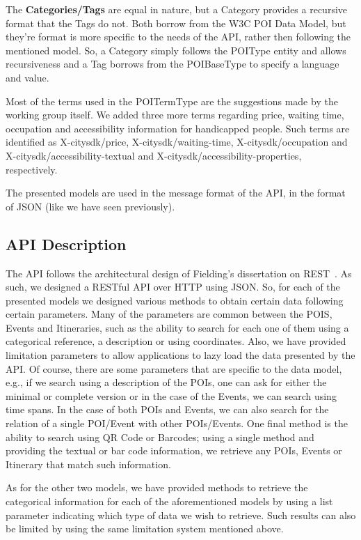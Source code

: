 \documentclass[times]{ettauth}
\begin{document}
The \textbf{Categories/Tags} are equal in nature, but a Category provides a recursive format that the Tags do not. Both borrow from the W3C POI Data Model, but they're format is more specific to the needs of the API, rather then following the mentioned model. So, a Category simply follows the POIType entity and allows recursiveness and a Tag borrows from the POIBaseType to specify a language and value.

Most of the terms used in the POITermType are the suggestions made by the working group itself. We added three more terms regarding price, waiting time, occupation and accessibility information for handicapped people. Such terms are identified as X-citysdk/price, X-citysdk/waiting-time, X-citysdk/occupation and X-citysdk/accessibility-textual and X-citysdk/accessibility-properties, respectively.

The presented models are used in the message format of the API, in the format of \ac{JSON} (like we have seen previously).

\subsection{API Description}
\label{api-description}
The API follows the architectural design of Fielding's dissertation on \ac{REST}~\cite{fielding}. As such, we designed a RESTful API over HTTP using JSON. So, for each of the presented models we designed various methods to obtain certain data following certain parameters. Many of the parameters are common between the POIS, Events and Itineraries, such as the ability to search for each one of them using a categorical reference, a description or using coordinates. Also, we have provided limitation parameters to allow applications to lazy load the data presented by the API. Of course, there are some parameters that are specific to the data model, e.g., if we search using a description of the POIs, one can ask for either the minimal or complete version or in the case of the Events, we can search using time spans. In the case of both POIs and Events, we can also search for the relation of a single POI/Event with other POIs/Events. One final method is the ability to search using QR Code or Barcodes; using a single method and providing the textual or bar code information, we retrieve any POIs, Events or Itinerary that match such information.

As for the other two models, we have provided methods to retrieve the categorical information for each of the aforementioned models by using a list parameter indicating which type of data we wish to retrieve. Such results can also be limited by using the same limitation system mentioned above.
\end{document}
